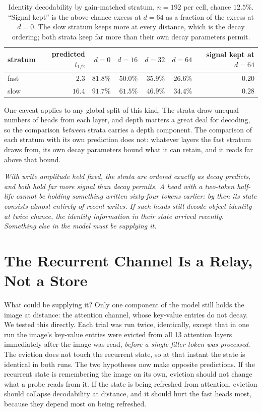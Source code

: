 \documentclass{article}
\begin{document}
\begin{table}[t]
\centering\small
\begin{tabular}{lrrrrrr}
\toprule
stratum & predicted $t_{1/2}$ & $d{=}0$ & $d{=}16$ & $d{=}32$ & $d{=}64$ & signal kept at $d{=}64$ \\
\midrule
fast & $2.3$  & $81.8\%$ & $50.0\%$ & $35.9\%$ & $26.6\%$ & $0.20$ \\
slow & $16.4$ & $91.7\%$ & $61.5\%$ & $46.9\%$ & $34.4\%$ & $0.28$ \\
\bottomrule
\end{tabular}
\caption{Identity decodability by gain-matched stratum, $n = 192$ per cell,
chance $12.5\%$. ``Signal kept'' is the above-chance excess at $d{=}64$ as a
fraction of the excess at $d{=}0$. The slow stratum keeps more at every
distance, which is the decay ordering; both strata keep far more than their
own decay parameters permit.}
\label{tab:strata}
\end{table}

One caveat applies to any global split of this kind. The strata draw unequal
numbers of heads from each layer, and depth matters a great deal for decoding,
so the comparison \emph{between} strata carries a depth component. The
comparison of each stratum with its own prediction does not: whatever layers
the fast stratum draws from, its own decay parameters bound what it can
retain, and it reads far above that bound.

\emph{With write amplitude held fixed, the strata are ordered exactly as decay
predicts, and both hold far more signal than decay permits. A head with a
two-token half-life cannot be holding something written sixty-four tokens
earlier: by then its state consists almost entirely of recent writes. If such
heads still decode object identity at twice chance, the identity information
in their state arrived recently. Something else in the model must be supplying
it.}

\section{The Recurrent Channel Is a Relay, Not a Store}
\label{sec:relay}

What could be supplying it? Only one component of the model still holds the
image at distance: the attention channel, whose key-value entries do not
decay. We tested this directly. Each trial was run twice, identically, except
that in one run the image's key-value entries were evicted from all 13
attention layers immediately after the image was read, \emph{before a single
filler token was processed}. The eviction does not touch the recurrent state,
so at that instant the state is identical in both runs. The two hypotheses now
make opposite predictions. If the recurrent state is remembering the image on
its own, eviction should not change what a probe reads from it. If the state
is being refreshed from attention, eviction should collapse decodability at
distance, and it should hurt the fast heads most, because they depend most on
being refreshed.
\end{document}
